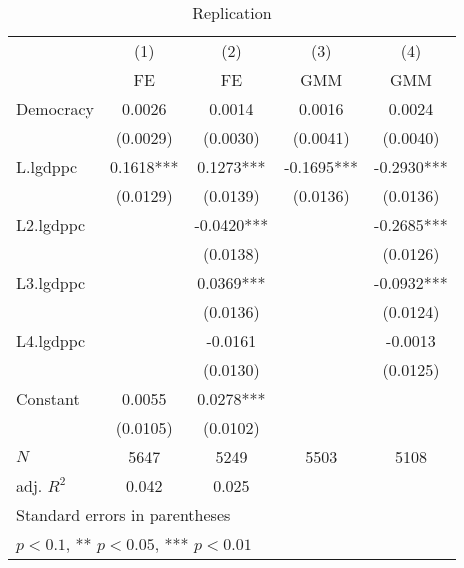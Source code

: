 \begin{table}[htbp]\centering
\def\sym#1{\ifmmode^{#1}\else\(^{#1}\)\fi}
\caption{Replication \label{tab:regression1}}
\begin{tabular}{l*{4}{c}}
\hline\hline
            &\multicolumn{1}{c}{(1)}&\multicolumn{1}{c}{(2)}&\multicolumn{1}{c}{(3)}&\multicolumn{1}{c}{(4)}\\
            &\multicolumn{1}{c}{FE}&\multicolumn{1}{c}{FE}&\multicolumn{1}{c}{GMM}&\multicolumn{1}{c}{GMM}\\
\hline
Democracy   &      0.0026   &      0.0014   &      0.0016   &      0.0024   \\
            &    (0.0029)   &    (0.0030)   &    (0.0041)   &    (0.0040)   \\
[1em]
L.lgdppc    &      0.1618***&      0.1273***&     -0.1695***&     -0.2930***\\
            &    (0.0129)   &    (0.0139)   &    (0.0136)   &    (0.0136)   \\
[1em]
L2.lgdppc   &               &     -0.0420***&               &     -0.2685***\\
            &               &    (0.0138)   &               &    (0.0126)   \\
[1em]
L3.lgdppc   &               &      0.0369***&               &     -0.0932***\\
            &               &    (0.0136)   &               &    (0.0124)   \\
[1em]
L4.lgdppc   &               &     -0.0161   &               &     -0.0013   \\
            &               &    (0.0130)   &               &    (0.0125)   \\
[1em]
Constant    &      0.0055   &      0.0278***&               &               \\
            &    (0.0105)   &    (0.0102)   &               &               \\
\hline
\(N\)       &        5647   &        5249   &        5503   &        5108   \\
adj. \(R^{2}\)&       0.042   &       0.025   &               &               \\
\hline\hline
\multicolumn{5}{l}{\footnotesize Standard errors in parentheses}\\
\multicolumn{5}{l}{\footnotesize * \(p<0.1\), ** \(p<0.05\), *** \(p<0.01\)}\\
\end{tabular}
\end{table}

